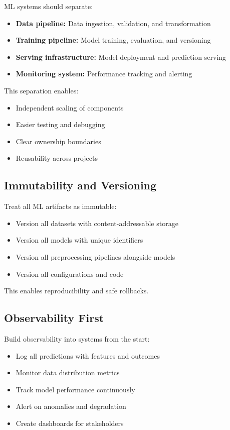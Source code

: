 ML systems should separate:

\begin{itemize}
    \item \textbf{Data pipeline:} Data ingestion, validation, and transformation
    \item \textbf{Training pipeline:} Model training, evaluation, and versioning
    \item \textbf{Serving infrastructure:} Model deployment and prediction serving
    \item \textbf{Monitoring system:} Performance tracking and alerting
\end{itemize}

This separation enables:
\begin{itemize}
    \item Independent scaling of components
    \item Easier testing and debugging
    \item Clear ownership boundaries
    \item Reusability across projects
\end{itemize}

\subsection{Immutability and Versioning}

Treat all ML artifacts as immutable:

\begin{itemize}
    \item Version all datasets with content-addressable storage
    \item Version all models with unique identifiers
    \item Version all preprocessing pipelines alongside models
    \item Version all configurations and code
\end{itemize}

This enables reproducibility and safe rollbacks.

\subsection{Observability First}

Build observability into systems from the start:

\begin{itemize}
    \item Log all predictions with features and outcomes
    \item Monitor data distribution metrics
    \item Track model performance continuously
    \item Alert on anomalies and degradation
    \item Create dashboards for stakeholders
\end{itemize}

